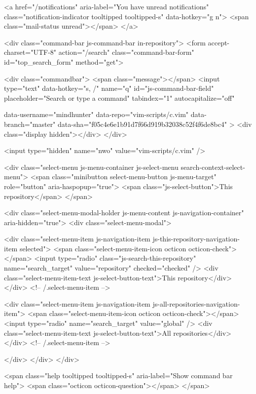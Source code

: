     
    <a href="/notifications" aria-label="You have unread notifications" class="notification-indicator tooltipped tooltipped-s" data-hotkey="g n">
        <span class="mail-status unread"></span>
</a>

      <div class="command-bar js-command-bar  in-repository">
          <form accept-charset="UTF-8" action="/search" class="command-bar-form" id="top_search_form" method="get">

<div class="commandbar">
  <span class="message"></span>
  <input type="text" data-hotkey="s, /" name="q" id="js-command-bar-field" placeholder="Search or type a command" tabindex="1" autocapitalize="off"
    
    data-username="mindhunter"
      data-repo="vim-scripts/c.vim"
      data-branch="master"
      data-sha="f05c4e6e1b91d7f66d919b32038c52f4f6de8bc4"
  >
  <div class="display hidden"></div>
</div>

    <input type="hidden" name="nwo" value="vim-scripts/c.vim" />

    <div class="select-menu js-menu-container js-select-menu search-context-select-menu">
      <span class="minibutton select-menu-button js-menu-target" role="button" aria-haspopup="true">
        <span class="js-select-button">This repository</span>
      </span>

      <div class="select-menu-modal-holder js-menu-content js-navigation-container" aria-hidden="true">
        <div class="select-menu-modal">

          <div class="select-menu-item js-navigation-item js-this-repository-navigation-item selected">
            <span class="select-menu-item-icon octicon octicon-check"></span>
            <input type="radio" class="js-search-this-repository" name="search_target" value="repository" checked="checked" />
            <div class="select-menu-item-text js-select-button-text">This repository</div>
          </div> <!-- /.select-menu-item -->

          <div class="select-menu-item js-navigation-item js-all-repositories-navigation-item">
            <span class="select-menu-item-icon octicon octicon-check"></span>
            <input type="radio" name="search_target" value="global" />
            <div class="select-menu-item-text js-select-button-text">All repositories</div>
          </div> <!-- /.select-menu-item -->

        </div>
      </div>
    </div>

  <span class="help tooltipped tooltipped-s" aria-label="Show command bar help">
    <span class="octicon octicon-question"></span>
  </span>


